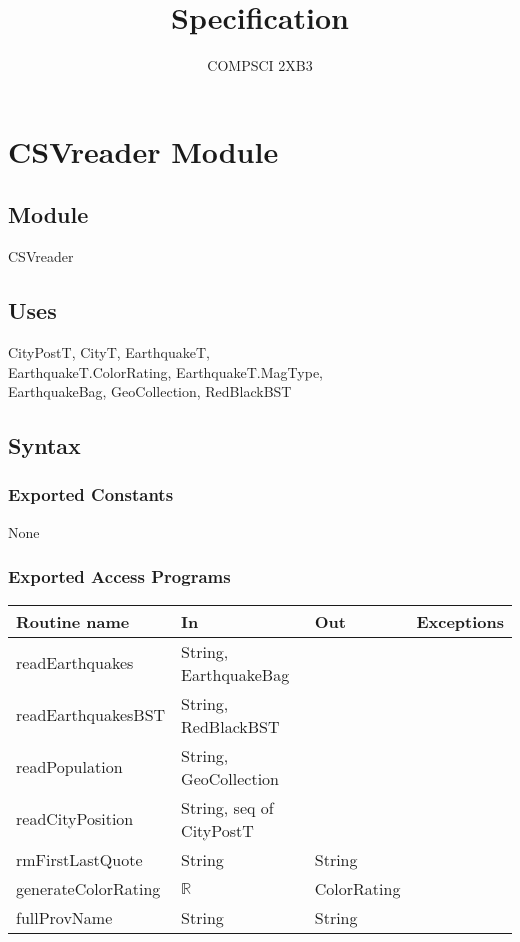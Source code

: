 \documentclass[12pt]{article}
\title{Specification}
\author{COMPSCI 2XB3}
\begin{document}
\newpage

\section* {CSVreader Module}

\subsection* {Module}

CSVreader

\subsection* {Uses}

CityPostT, CityT, EarthquakeT,\\
EarthquakeT.ColorRating, EarthquakeT.MagType,\\
EarthquakeBag, GeoCollection, RedBlackBST

\subsection* {Syntax}

\subsubsection* {Exported Constants}

None

\subsubsection* {Exported Access Programs}

\begin{tabular}{| l | l | l | l |}
\hline
\textbf{Routine name} & \textbf{In} & \textbf{Out} & \textbf{Exceptions}\\
\hline
readEarthquakes & String, EarthquakeBag & ~ & ~\\
\hline
readEarthquakesBST & String, RedBlackBST & ~ & ~\\
\hline
readPopulation & String, GeoCollection & ~ & ~\\
\hline
readCityPosition & String, seq of CityPostT & ~ & ~\\
\hline
rmFirstLastQuote & String & String & ~\\
\hline
generateColorRating & $\mathbb{R}$ & ColorRating & ~\\
\hline
fullProvName & String & String & ~\\
\hline
\end{tabular}
\end{document}
